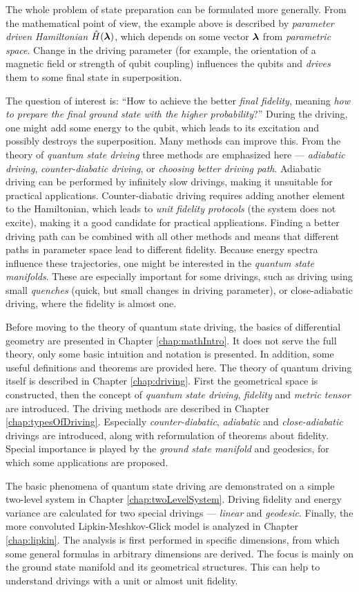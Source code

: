 The whole problem of state preparation can be formulated more generally. From the mathematical point of view, the example above is described by \emph{parameter driven Hamiltonian} $\hat{H}({\bm\lambda})$, which depends on some vector ${\bm\lambda}$ from \emph{parametric space}. Change in the driving parameter (for example, the orientation of a magnetic field or strength of qubit coupling) influences the qubits and \emph{drives} them to some final state in superposition.

The question of interest is: “How to achieve the better \emph{final fidelity}, meaning \emph{how to prepare the final ground state with the higher probability}?” During the driving, one might add some energy to the qubit, which leads to its excitation and possibly destroys the superposition. Many methods can improve this. From the theory of \emph{quantum state driving} three methods are emphasized here — \emph{adiabatic driving}, \emph{counter-diabatic driving}, or \emph{choosing better driving path}. Adiabatic driving can be performed by infinitely slow drivings, making it unsuitable for practical applications. Counter-diabatic driving requires adding another element to the Hamiltonian, which leads to \emph{unit fidelity protocols} (the system does not excite), making it a good candidate for practical applications. Finding a better driving path can be combined with all other methods and means that different paths in parameter space lead to different fidelity. Because energy spectra influence these trajectories, one might be interested in the \emph{quantum state manifolds}. These are especially important for some drivings, such as driving using small \emph{quenches} (quick, but small changes in driving parameter), or close-adiabatic driving, where the fidelity is almost one.

Before moving to the theory of quantum state driving, the basics of differential geometry are presented in Chapter \ref{chap:mathIntro}. It does not serve the full theory, only some basic intuition and notation is presented. In addition, some useful definitions and theorems are provided here. The theory of quantum driving itself is described in Chapter \ref{chap:driving}. First the geometrical space is constructed, then the concept of \emph{quantum state driving}, \emph{fidelity} and \emph{metric tensor} are introduced.
The driving methods are described in Chapter \ref{chap:typesOfDriving}. Especially \emph{counter-diabatic}, \emph{adiabatic} and \emph{close-adiabatic} drivings are introduced, along with reformulation of theorems about fidelity. Special importance is played by the \emph{ground state manifold} and geodesics, for which some applications are proposed.

The basic phenomena of quantum state driving are demonstrated on a simple two-level system in Chapter \ref{chap:twoLevelSystem}. Driving fidelity and energy variance are calculated for two special drivings — \emph{linear} and \emph{geodesic}. Finally, the more convoluted Lipkin-Meshkov-Glick model is analyzed in Chapter \ref{chap:lipkin}. The analysis is first performed in specific dimensions, from which some general formulas in arbitrary dimensions are derived. The focus is mainly on the ground state manifold and its geometrical structures. This can help to understand drivings with a unit or almost unit fidelity.